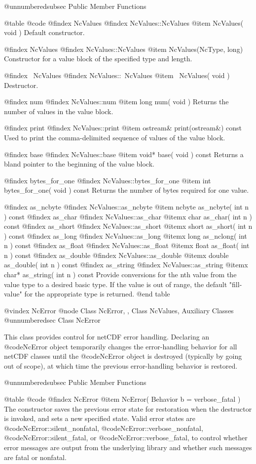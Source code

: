 @unnumberedsubsec Public Member Functions

@table @code
@findex NcValues
@findex NcValues::NcValues
@item NcValues( void )
Default constructor.

@findex NcValues
@findex NcValues::NcValues
@item NcValues(NcType, long)
Constructor for a value block of the specified type and length.

@findex ~NcValues
@findex NcValues::~NcValues
@item ~NcValues( void )
Destructor.

@findex num
@findex NcValues::num
@item long num( void )
Returns the number of values in the value block.

@findex print
@findex NcValues::print
@item ostream& print(ostream&) const
Used to print the comma-delimited sequence of values of the value block.

@findex base
@findex NcValues::base
@item void* base( void ) const
Returns a bland pointer to the beginning of the value block.

@findex bytes_for_one
@findex NcValues::bytes_for_one
@item int bytes_for_one( void ) const
Returns the number of bytes required for one value.

@findex as_ncbyte
@findex NcValues::as_ncbyte
@item ncbyte as_ncbyte( int n ) const
@findex as_char
@findex NcValues::as_char
@itemx char as_char( int n ) const
@findex as_short
@findex NcValues::as_short
@itemx short as_short( int n ) const
@findex as_long
@findex NcValues::as_long
@itemx long as_nclong( int n ) const
@findex as_float
@findex NcValues::as_float
@itemx float as_float( int n ) const
@findex as_double
@findex NcValues::as_double
@itemx double as_double( int n ) const
@findex as_string
@findex NcValues::as_string
@itemx char* as_string( int n ) const
Provide conversions for the nth value from the value type to a desired
basic type.  If the value is out of range, the default "fill-value" for
the appropriate type is returned.
@end table

@vindex NcError
@node Class NcError,  , Class NcValues, Auxiliary Classes
@unnumberedsec  Class NcError

This class provides control for netCDF error handling.  Declaring an
@code{NcError} object temporarily changes the error-handling behavior
for all netCDF classes until the @code{NcError} object is destroyed
(typically by going out of scope), at which time the previous
error-handling behavior is restored.

@unnumberedsubsec Public Member Functions

@table @code
@findex NcError
@item NcError( Behavior b = verbose_fatal )
The constructor saves the previous error state for restoration when the
destructor is invoked, and sets a new specified state.  Valid error
states are @code{NcError::silent_nonfatal},
@code{NcError::verbose_nonfatal}, @code{NcError::silent_fatal}, or
@code{NcError::verbose_fatal}, to control whether error messages are
output from the underlying library and whether such messages are fatal
or nonfatal.

